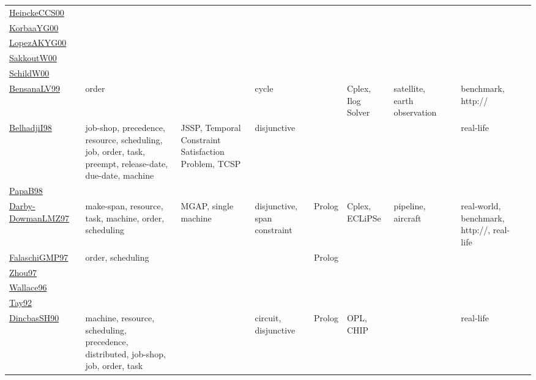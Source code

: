 {\begin{longtable}{p{3cm}p{4cm}p{2cm}p{2cm}p{2cm}p{2cm}p{2cm}p{2cm}p{2cm}p{2cm}}
\href{articles/HeipckeCCS00.pdf}{HeipckeCCS00}~\cite{HeipckeCCS00} &  &  &  &  &  &  &  &  & \\
\href{articles/KorbaaYG00.pdf}{KorbaaYG00}~\cite{KorbaaYG00} &  &  &  &  &  &  &  &  & \\
\href{articles/LopezAKYG00.pdf}{LopezAKYG00}~\cite{LopezAKYG00} &  &  &  &  &  &  &  &  & \\
\href{articles/SakkoutW00.pdf}{SakkoutW00}~\cite{SakkoutW00} &  &  &  &  &  &  &  &  & \\
\href{articles/SchildW00.pdf}{SchildW00}~\cite{SchildW00} &  &  &  &  &  &  &  &  & \\
\href{articles/BensanaLV99.pdf}{BensanaLV99}~\cite{BensanaLV99} & order &  & cycle &  & Cplex, Ilog Solver & satellite, earth observation &  & benchmark, http:// & \\
\href{articles/BelhadjiI98.pdf}{BelhadjiI98}~\cite{BelhadjiI98} & job-shop, precedence, resource, scheduling, job, order, task, preempt, release-date, due-date, machine & JSSP, Temporal Constraint Satisfaction Problem, TCSP & disjunctive &  &  &  &  & real-life & \\
\href{articles/PapaB98.pdf}{PapaB98}~\cite{PapaB98} &  &  &  &  &  &  &  &  & \\
\href{articles/Darby-DowmanLMZ97.pdf}{Darby-DowmanLMZ97}~\cite{Darby-DowmanLMZ97} & make-span, resource, task, machine, order, scheduling & MGAP, single machine & disjunctive, span constraint & Prolog & Cplex, ECLiPSe & pipeline, aircraft &  & real-world, benchmark, http://, real-life & \\
\href{articles/FalaschiGMP97.pdf}{FalaschiGMP97}~\cite{FalaschiGMP97} & order, scheduling &  &  & Prolog &  &  &  &  & \\
\href{articles/Zhou97.pdf}{Zhou97}~\cite{Zhou97} &  &  &  &  &  &  &  &  & \\
\href{articles/Wallace96.pdf}{Wallace96}~\cite{Wallace96} &  &  &  &  &  &  &  &  & \\
\href{}{Tay92}~\cite{Tay92} &  &  &  &  &  &  &  &  & \\
\href{articles/DincbasSH90.pdf}{DincbasSH90}~\cite{DincbasSH90} & machine, resource, scheduling, precedence, distributed, job-shop, job, order, task &  & circuit, disjunctive & Prolog & OPL, CHIP &  &  & real-life & \\
\end{longtable}
}

